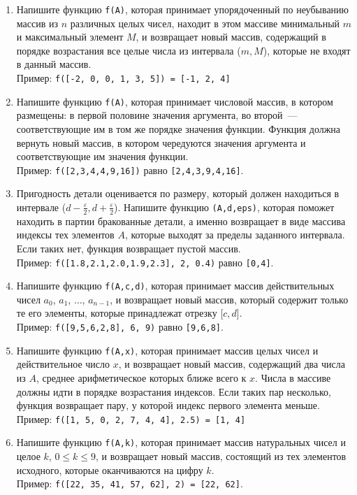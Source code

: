 \documentclass{article}
\begin{document}
\begin{enumerate}[label={}, leftmargin=0pt, itemindent=0pt]
\begin{enumerate}[label=\arabic{enumi}.\arabic*.]
\item 
Напишите функцию \texttt{f(A)}, которая принимает упорядоченный по неубыванию массив из $n$ различных целых чисел, находит в этом массиве минимальный $m$ и максимальный элемент $M$, и возвращает новый массив, содержащий в порядке возрастания все целые числа из интервала ($m, M$), которые не входят в данный массив.
\\Пример: \texttt{f([-2, 0, 0, 1, 3, 5]) = [-1, 2, 4]}

\item 
Напишите функцию \texttt{f(A)}, которая принимает числовой массив, в котором размещены: в первой половине значения аргумента, во второй~--- соответствующие им в том же порядке значения функции. Функция должна вернуть новый массив, в котором чередуются значения аргумента и соответствующие им значения функции.
\\Пример: \texttt{f([2,3,4,4,9,16])} равно \texttt{[2,4,3,9,4,16]}.

\item 
Пригодность детали оценивается по размеру, который должен находиться в интервале ($d - \frac{\varepsilon}{2}, d + \frac{\varepsilon}{2}$). Напишите функцию \texttt{(A,d,eps)}, которая поможет находить в партии бракованные детали, а именно возвращает в виде массива индексы тех элементов $A$, которые выходят за пределы заданного интервала.  Если таких нет, функция возвращает пустой массив.
\\Пример: \texttt{f([1.8,2.1,2.0,1.9,2.3],\,2,\,0.4)} равно \texttt{[0,4]}.

\item 
Напишите функцию \texttt{f(A,c,d)}, которая принимает массив действительных чисел $a_0$, $a_1$, $\ldots$, $a_{n-1}$, и возвращает новый массив, который содержит только те его элементы, которые принадлежат отрезку [$c, d$].
\\Пример: \texttt{f([9,5,6,2,8],\,6,\,9)} равно \texttt{[9,6,8]}.

\item 
Напишите функцию \texttt{f(A,x)}, которая принимает массив целых чисел и действительное число $x$, и возвращает новый массив, содержащий два числа из  $A$, среднее арифметическое которых ближе всего к $x$. Числа в массиве должны идти в порядке возрастания индексов. Если таких пар несколько, функция возвращает пару, у которой индекс первого элемента меньше. 
\\Пример: \texttt{f([1, 5, 0, 2, 7, 4, 4], 2.5) = [1, 4]}

\item 
Напишите функцию \texttt{f(A,k)}, которая принимает массив натуральных чисел и целое $k$,  $0\leqslant k \leqslant 9$, и возвращает новый массив, состоящий из тех элементов исходного, которые оканчиваются на цифру $k$.
\\Пример: \texttt{f([22, 35, 41, 57, 62], 2) = [22, 62]}.
\end{enumerate}


\end{enumerate}
\end{document}
